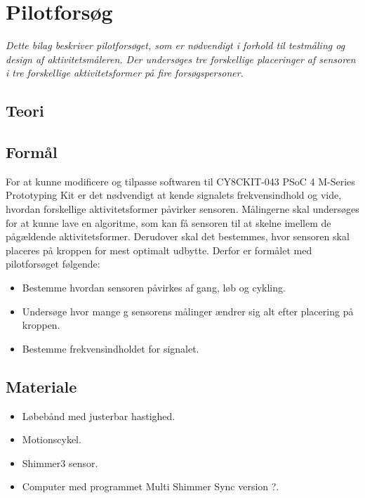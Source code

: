 \chapter{Pilotforsøg}\vspace{-.75cm}
\textit{Dette bilag beskriver pilotforsøget, som er nødvendigt i forhold til testmåling og design af aktivitetsmåleren. Der undersøges tre forskellige placeringer af sensoren i tre forskellige aktivitetsformer på fire forsøgspersoner.}

\section{Teori}

\section{Formål}
For at kunne modificere og tilpasse softwaren til CY8CKIT-043 PSoC 4 M-Series Prototyping Kit er det nødvendigt at kende signalets frekvensindhold og vide, hvordan forskellige aktivitetsformer påvirker sensoren. Målingerne skal undersøges for at kunne lave en algoritme, som kan få sensoren til at skelne imellem de pågældende aktivitetsformer. Derudover skal det bestemmes, hvor sensoren skal placeres på kroppen for mest optimalt udbytte. Derfor er formålet med pilotforsøget følgende:
\begin{itemize}
	\item Bestemme hvordan sensoren påvirkes af gang, løb og cykling.
	\item Undersøge hvor mange g sensorens målinger ændrer sig alt efter placering på kroppen.
	\item Bestemme frekvensindholdet for signalet.
\end{itemize}

\section{Materiale}
\begin{itemize}
	\item Løbebånd med justerbar hastighed. %
	\item Motionscykel.
	\item Shimmer3 sensor.
	\item Computer med programmet Multi Shimmer Sync version ?.
\end{itemize}

